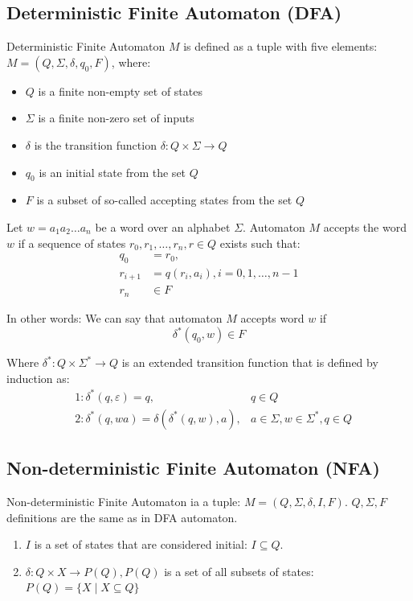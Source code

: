 \documentclass{ctuthesis}
\begin{document}
\subsection{Deterministic Finite Automaton (DFA)}
Deterministic Finite Automaton $M$ is defined as a tuple with five elements: $M = (Q, \Sigma, \delta, q_0, F)$, where:
\begin{itemize}
	\item $Q$ is a finite non-empty set of states
	\item $\Sigma$ is a finite non-zero set of inputs
	\item $\delta$ is the transition function $\delta : Q \times \Sigma \rightarrow Q$
	\item $q_0$ is an initial state from the set $Q$
	\item $F$ is a subset of so-called accepting states from the set $Q$
\end{itemize}

Let $w=a_1a_2\ldots a_n$ be a word over an alphabet $\Sigma$. Automaton $M$ accepts the word $w$ if a sequence of states $r_0, r_1, \ldots, r_n, r \in Q$ exists such that:
\begin{align*}
	q_0 &= r_0, \\
	r_{i+1} &= q(r_i, a_i), i=0, 1, \ldots, n-1 \\
	r_n &\in F
\end{align*}

In other words: We can say that automaton $M$ accepts word $w$ if
\begin{equation*}
	\delta^*(q_0, w) \in F
\end{equation*}

Where $\delta^* : Q \times \Sigma^* \rightarrow Q$ is an extended transition function that is defined by induction as:
\begin{align*}
	&1: \delta^*(q, \varepsilon) = q, &q \in Q \\
	&2: \delta^*(q, wa) = \delta(\delta^*(q, w), a), &a \in \Sigma, w \in \Sigma^*, q \in Q
\end{align*}

\subsection{Non-deterministic Finite Automaton (NFA)}
Non-deterministic Finite Automaton ia a tuple: $M = (Q, \Sigma, \delta, I, F)$. $Q, \Sigma, F$ definitions are the same as in DFA automaton. 
\begin{enumerate}
	\item $I$ is a set of states that are considered initial: $I \subseteq Q$.
	\item $\delta : Q \times X \rightarrow P(Q), P(Q)$ is a set of all subsets of states: $P(Q) = \{X \mid X \subseteq Q\}$
\end{enumerate}
\end{document}
